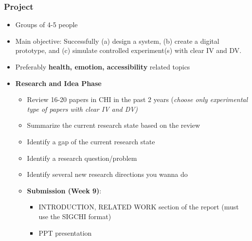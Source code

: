\documentclass{beamer}
\begin{document}
\begin{frame}
\frametitle{Project}
\footnotesize
\begin{itemize}
	\item Groups of 4-5 people
	\item Main objective:  Successfully (a) design a system,  (b) create a digital prototype,  and (c) simulate controlled experiment(s) with clear IV and DV.   
    \item Preferably \textbf{health, emotion, accessibility} related topics
	\item \textbf{Research and Idea Phase}
	\begin{itemize}
		\item Review 16-20 papers in CHI in the past 2 years (\textit{choose only experimental type of papers with clear IV and DV)}
		\item Summarize the current research state based on the review
		\item Identify a gap of the current research state
		\item Identify a research question/problem
		\item Identify several new research directions you wanna do
		\item \textbf{Submission (Week 9)}:
		\begin{itemize}
			\item  INTRODUCTION, RELATED WORK section of the report (must use the SIGCHI format)
			\item PPT presentation
		\end{itemize}
	\end{itemize}
\end{itemize}
\end{frame}
\end{document}
